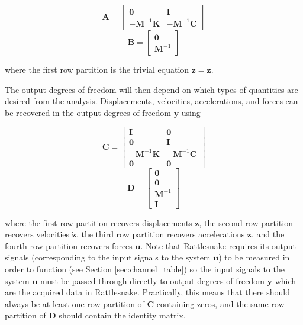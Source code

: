 \documentclass[pdf,12pt,report]{SANDreport}
\begin{document}
    \begin{equation}\label{eq:state_space_a}
        \mathbf{A} = \begin{bmatrix}
        \mathbf{0} & \mathbf{I} \\
        -\mathbf{M}^{-1}\mathbf{K} & -\mathbf{M}^{-1}\mathbf{C}
        \end{bmatrix}
    \end{equation}
    \begin{equation}\label{eq:state_space_b}
        \mathbf{B} = \begin{bmatrix}
        \mathbf{0} \\ \mathbf{M}^{-1}
        \end{bmatrix}
    \end{equation}
    
    where the first row partition is the trivial equation $\dot{\mathbf{z}} = \dot{\mathbf{z}}$.
    
    The output degrees of freedom will then depend on which types of quantities are desired from the analysis.  Displacements, velocities, accelerations, and forces can be recovered in the output degrees of freedom $\mathbf{y}$ using
    
    \begin{equation}\label{eq:state_space_c}
        \mathbf{C} = \begin{bmatrix}
        \mathbf{I} & \mathbf{0} \\
        \mathbf{0} & \mathbf{I} \\
        -\mathbf{M}^{-1}\mathbf{K} & -\mathbf{M}^{-1}\mathbf{C} \\
        \mathbf{0} & \mathbf{0}
        \end{bmatrix}
    \end{equation}
    \begin{equation}\label{eq:state_space_d}
        \mathbf{D} = \begin{bmatrix}
        \mathbf{0} \\\mathbf{0} \\ \mathbf{M}^{-1} \\ \mathbf{I}
        \end{bmatrix}
    \end{equation}
    
    where the first row partition recovers displacements $\mathbf{z}$, the second row partition recovers velocities $\dot{\mathbf{z}}$, the third row partition recovers accelerations $\ddot{\mathbf{z}}$, and the fourth row partition recovers forces $\mathbf{u}$.  Note that Rattlesnake requires its output signals (corresponding to the input signals to the system $\mathbf{u}$) to be measured in order to function (see Section \ref{sec:channel_table}) so the input signals to the system $\mathbf{u}$ must be passed through directly to output degrees of freedom $\mathbf{y}$ which are the acquired data in Rattlesnake.  Practically, this means that there should always be at least one row partition of $\mathbf{C}$ containing zeros, and the same row partition of $\mathbf{D}$ should contain the identity matrix.
    
\end{document}

